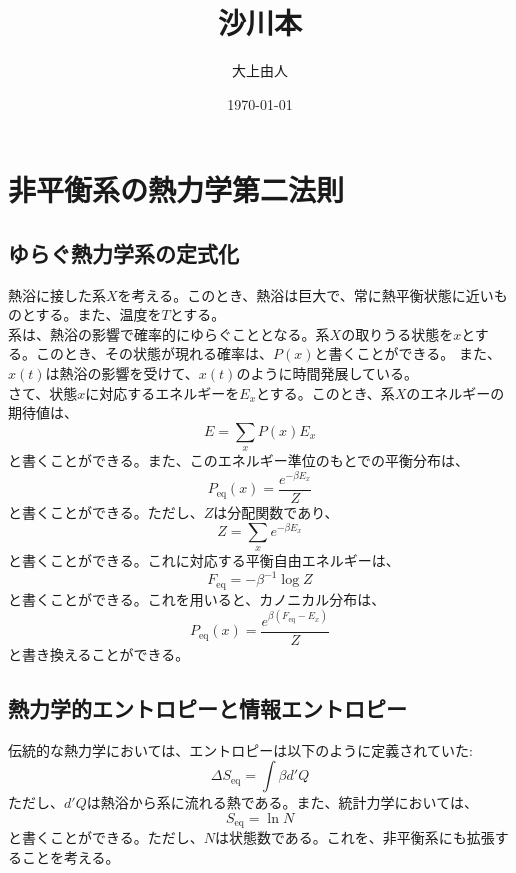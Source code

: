 \documentclass[a4paper,11pt]{jsarticle}
\numberwithin{equation}{section}
\begin{document}
\title{沙川本}
\author{大上由人}
\date{\today}
\maketitle

\section{非平衡系の熱力学第二法則}
\subsection{ゆらぐ熱力学系の定式化}
熱浴に接した系$X$を考える。このとき、熱浴は巨大で、常に熱平衡状態に近いものとする。また、温度を$T$とする。\\
系は、熱浴の影響で確率的にゆらぐこととなる。系$X$の取りうる状態を$x$とする。このとき、その状態が現れる確率は、$P(x)$と書くことができる。
また、$x(t)$は熱浴の影響を受けて、$x(t)$のように時間発展している。\\
さて、状態$x$に対応するエネルギーを$E_x$とする。このとき、系$X$のエネルギーの期待値は、
\begin{equation}
    E = \sum_x P(x)E_x
\end{equation}
と書くことができる。また、このエネルギー準位のもとでの平衡分布は、
\begin{equation}
    P_{\text{eq}}(x) = \frac{e^{-\beta E_x}}{Z}
\end{equation}
と書くことができる。ただし、$Z$は分配関数であり、
\begin{equation}
    Z = \sum_x e^{-\beta E_x}
\end{equation}
と書くことができる。これに対応する平衡自由エネルギーは、
\begin{equation}
    F_{\text{eq}} = -\beta^{-1}\log Z
\end{equation}
と書くことができる。これを用いると、カノニカル分布は、
\begin{equation}
    P_{\text{eq}}(x) = \frac{e^{\beta(F_{\text{eq}}-E_x)}}{Z}
\end{equation}
と書き換えることができる。

\subsection*{熱力学的エントロピーと情報エントロピー}
伝統的な熱力学においては、エントロピーは以下のように定義されていた:
\begin{equation}
    \Delta S_{\text{eq}} = \int \beta d'Q
\end{equation}
ただし、$d'Q$は熱浴から系に流れる熱である。また、統計力学においては、
\begin{equation}
    S_{\text{eq}} = \ln N
\end{equation}
と書くことができる。ただし、$N$は状態数である。これを、非平衡系にも拡張することを考える。\\
\end{document}
